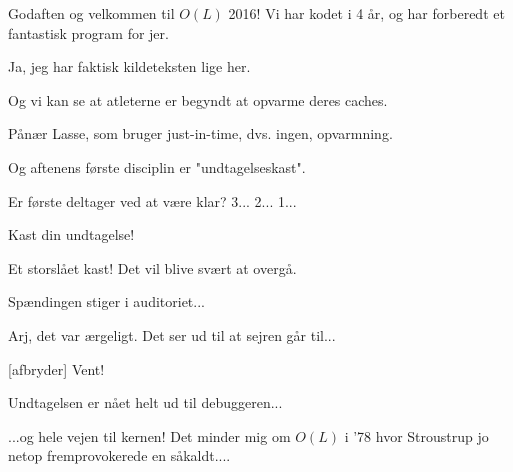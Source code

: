 \documentclass[a4paper,11pt]{article}
\begin{document}
\begin{sketch}


   Godaften og velkommen til $O(L)$ 2016! Vi har kodet i 4 år, og har
  forberedt et fantastisk program for jer.

   Ja, jeg har faktisk kildeteksten lige her.

   Og vi kan se at atleterne er begyndt at opvarme deres caches.

   Pånær Lasse, som bruger just-in-time, dvs. ingen, opvarmning.

   Og aftenens første disciplin er "undtagelseskast".


   Er første deltager ved at være klar? 3... 2... 1...

   Kast din undtagelse!


   Et storslået kast!  Det vil blive svært at overgå.


   Spændingen stiger i auditoriet...


   Arj, det var ærgeligt.  Det ser ud til at sejren går til...

  [afbryder] Vent!


   Undtagelsen er nået helt ud til debuggeren...


   ...og hele vejen til kernen!  Det minder mig om $O(L)$ i
  '78 hvor Stroustrup jo netop fremprovokerede en såkaldt....



\end{sketch}
\end{document}
